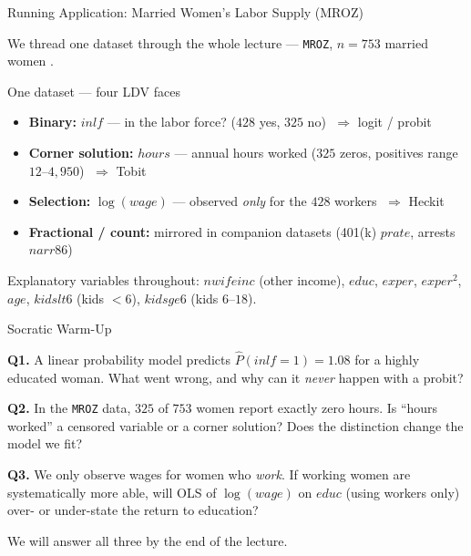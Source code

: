 \documentclass[aspectratio=169, 12pt]{beamer}
\begin{document}
\begin{frame}[shrink=8]{Running Application: Married Women's Labor Supply (MROZ)}

  We thread one dataset through the whole lecture --- \texttt{MROZ}, $n=753$
  married women \citep{Mroz1987_sensitivity}.

  \smallskip

  \begin{examplebox}{One dataset --- four LDV faces}
    \begin{itemize}
      \item \textbf{Binary:} $inlf$ --- in the labor force? ($428$ yes, $325$ no)
        $\;\Rightarrow$ logit / probit
      \item \textbf{Corner solution:} $hours$ --- annual hours worked ($325$ zeros,
        positives range $12$--$4{,}950$) $\;\Rightarrow$ Tobit
      \item \textbf{Selection:} $\log(wage)$ --- observed \emph{only} for the $428$
        workers $\;\Rightarrow$ Heckit
      \item \textbf{Fractional / count:} mirrored in companion datasets (401(k)
        $prate$, arrests $narr86$)
    \end{itemize}
  \end{examplebox}

  \smallskip

  \begin{highlightbox}
    Explanatory variables throughout: $nwifeinc$ (other income), $educ$, $exper$,
    $exper^2$, $age$, $kidslt6$ (kids $<6$), $kidsge6$ (kids $6$--$18$).
  \end{highlightbox}

\end{frame}

\begin{frame}[shrink=10]{Socratic Warm-Up}

  \begin{keybox}
    \textbf{Q1.} A linear probability model predicts $\widehat{P}(inlf=1) = 1.08$
    for a highly educated woman. What went wrong, and why can it \emph{never}
    happen with a probit?

    \medskip

    \textbf{Q2.} In the \texttt{MROZ} data, $325$ of $753$ women report exactly
    zero hours. Is ``hours worked'' a censored variable or a corner solution? Does
    the distinction change the model we fit?

    \medskip

    \textbf{Q3.} We only observe wages for women who \emph{work}. If working women
    are systematically more able, will OLS of $\log(wage)$ on $educ$ (using workers
    only) over- or under-state the return to education?
  \end{keybox}

  \smallskip

  We will answer all three by the end of the lecture.

\end{frame}
\end{document}

